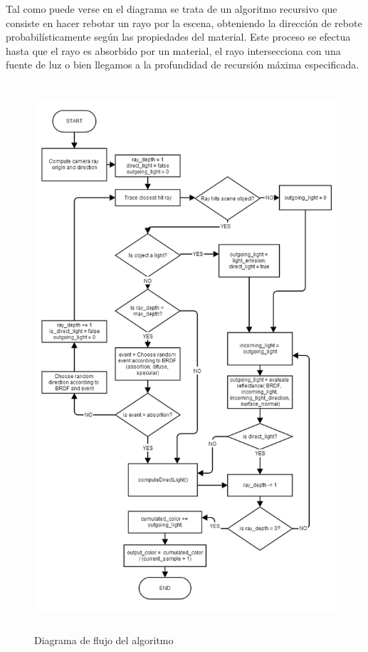 Tal como puede verse en el diagrama se trata de un algoritmo recursivo que consiste en hacer rebotar un rayo por la escena, obteniendo la dirección de rebote probabilísticamente según las propiedades del material. Este proceso se efectua hasta que el rayo es absorbido por un material, el rayo intersecciona con una fuente de luz o bien llegamos a la profundidad de recursión máxima especificada.

\begin{figure}
\label{fig:algorithm}
\centering
\includegraphics[height=8in]{algorithm.png}
\caption{Diagrama de flujo del algoritmo}
\vspace*{0.5in}
\end{figure}

\clearpage

